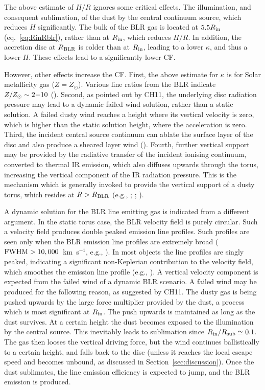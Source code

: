 \documentclass[a4paper,fleqn,usenatbib]{mnras}
\begin{document}
The above estimate of $H/R$ ignores some critical effects. The illumination,
and consequent sublimation, of the dust by the central continuum source,
which reduces $H$ significantly. The bulk of the BLR gas is located at $5.5R_{\rm in}$ 
(eq.~\ref{eq:RinRblr}), rather than at $R_{\rm in}$, which reduces $H/R$. 
In addition, the accretion disc at $R_{\rm BLR}$ is colder than at
$R_{\rm in}$, leading to a lower $\kappa$, and thus a lower $H$. 
These effects lead to a significantly lower CF. 

However, other effects increase the CF. 
First, the above estimate for $\kappa$ is for Solar metallicity
gas ($Z=Z_\odot$). Various line ratios from the BLR indicate $Z/Z_\odot\sim 2{\rm -}10$  
(\citealt{HamannFerland99, Dietrich03, Simon10}). Second, as pointed out by CH11, the underlying disc radiation pressure may lead to a dynamic failed wind solution, rather than a static solution.
A failed dusty wind reaches a height where its vertical velocity is zero, 
which is higher than the static solution height, where the acceleration is zero. 
Third, the incident central source continuum can ablate the surface layer of the disc 
and also produce a sheared layer wind (\citealt*{Pier95, Namekata14}).
Fourth, further vertical support may be provided by the radiative transfer of the 
incident ionising continuum, converted to  
thermal IR emission, which also diffuses upwards through the torus, increasing the vertical component
of the IR radiation pressure.
This is the mechanism which is generally invoked to provide the vertical support of a dusty torus, 
which resides at $R>R_{\rm BLR}$ (e.g., \citealt{Pier92, Honig06, Krolik07}; \citealt*{Dorod11}; \citealt{Wada12, 
Dorod12, Schartmann14, Chan16}).  

A dynamic solution for the BLR line emitting gas is indicated from a different argument.
In the static torus case, the BLR velocity field is purely circular. Such a velocity field 
produces double peaked emission line profiles. Such profiles are seen only when the
BLR emission line profiles are extremely broad (${\rm FWHM}>10,000$~km~s$^{-1}$, e.g., \citealt{Eracleous03}).
In most objects the line profiles are singly peaked, indicating a significant non-Keplerian contribution to the velocity field, which smoothes the emission line profile 
(e.g., \citealt*{Flohic12, Landt14, Pancoast14}). A vertical velocity component is expected 
from the failed wind of a dynamic BLR scenario. A failed wind may be
produced for the following reason, as suggested by CH11. The dusty gas is being pushed upwards by the large force 
multiplier provided by the dust, a process which is most significant at $R_{\rm in}$. 
The push upwards is maintained as long as the dust survives. At a certain
height the dust becomes exposed to the illumination by the central source. 
This inevitably leads to sublimation since $R_{\rm in}/R_{\rm sub}\simeq 0.1$.
The gas then looses the vertical driving force, but the wind continues ballistically
to a certain height, and falls back to the disc (unless it reaches the local escape speed and becomes unbound, as discussed in Section~\ref{sec:discussion}). Once the dust sublimates, the line emission efficiency is expected to jump, and the BLR emission is produced.
\end{document}
